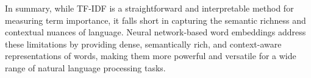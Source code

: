 In summary, while TF-IDF is a straightforward and interpretable method for measuring term importance, it falls short in capturing the semantic richness and contextual nuances of language. Neural network-based word embeddings address these limitations by providing dense, semantically rich, and context-aware representations of words, making them more powerful and versatile for a wide range of natural language processing tasks.